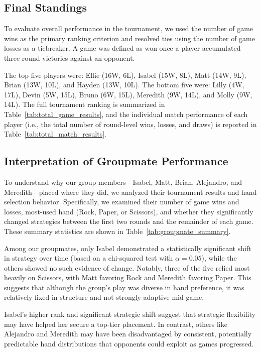 \documentclass[12pt]{article}
\begin{document}
\subsection*{Final Standings}

To evaluate overall performance in the tournament, we used the number of game wins as the primary ranking criterion and resolved ties using the number of game losses as a tiebreaker. A game was defined as won once a player accumulated three round victories against an opponent.

The top five players were: Ellie (16W, 6L), Isabel (15W, 8L), Matt (14W, 9L), Brian (13W, 10L), and Hayden (13W, 10L). The bottom five were: Lilly (4W, 17L), Devin (5W, 15L), Bruno (6W, 15L), Meredith (9W, 14L), and Molly (9W, 14L). The full tournament ranking is summarized in Table~\ref{tab:total_game_results}, and the individual match performance of each player (i.e., the total number of round-level wins, losses, and draws) is reported in Table~\ref{tab:total_match_results}.

\subsection*{Interpretation of Groupmate Performance}

To understand why our group members—Isabel, Matt, Brian, Alejandro, and Meredith—placed where they did, we analyzed their tournament results and hand selection behavior. Specifically, we examined their number of game wins and losses, most-used hand (Rock, Paper, or Scissors), and whether they significantly changed strategies between the first two rounds and the remainder of each game. These summary statistics are shown in Table~\ref{tab:groupmate_summary}.

Among our groupmates, only Isabel demonstrated a statistically significant shift in strategy over time (based on a chi-squared test with $\alpha = 0.05$), while the others showed no such evidence of change. Notably, three of the five relied most heavily on Scissors, with Matt favoring Rock and Meredith favoring Paper. This suggests that although the group’s play was diverse in hand preference, it was relatively fixed in structure and not strongly adaptive mid-game.

Isabel’s higher rank and significant strategic shift suggest that strategic flexibility may have helped her secure a top-tier placement. In contrast, others like Alejandro and Meredith may have been disadvantaged by consistent, potentially predictable hand distributions that opponents could exploit as games progressed.
\end{document}
